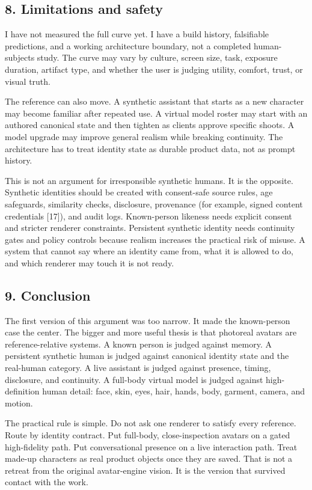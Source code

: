\documentclass[
]{article}
\begin{document}
\subsection{8. Limitations and safety}\label{8-limitations-and-safety}

I have not measured the full curve yet. I have a build history,
falsifiable predictions, and a working architecture boundary, not a
completed human-subjects study. The curve may vary by culture, screen
size, task, exposure duration, artifact type, and whether the user is
judging utility, comfort, trust, or visual truth.

The reference can also move. A synthetic assistant that starts as a new
character may become familiar after repeated use. A virtual model roster
may start with an authored canonical state and then tighten as clients
approve specific shoots. A model upgrade may improve general realism
while breaking continuity. The architecture has to treat identity state
as durable product data, not as prompt history.

This is not an argument for irresponsible synthetic humans. It is the
opposite. Synthetic identities should be created with consent-safe
source rules, age safeguards, similarity checks, disclosure, provenance
(for example, signed content credentials {[}17{]}), and audit logs.
Known-person likeness needs explicit consent and stricter renderer
constraints. Persistent synthetic identity needs continuity gates and
policy controls because realism increases the practical risk of misuse.
A system that cannot say where an identity came from, what it is allowed
to do, and which renderer may touch it is not ready.

\subsection{9. Conclusion}\label{9-conclusion}

The first version of this argument was too narrow. It made the
known-person case the center. The bigger and more useful thesis is that
photoreal avatars are reference-relative systems. A known person is
judged against memory. A persistent synthetic human is judged against
canonical identity state and the real-human category. A live assistant
is judged against presence, timing, disclosure, and continuity. A
full-body virtual model is judged against high-definition human detail:
face, skin, eyes, hair, hands, body, garment, camera, and motion.

The practical rule is simple. Do not ask one renderer to satisfy every
reference. Route by identity contract. Put full-body, close-inspection
avatars on a gated high-fidelity path. Put conversational presence on a
live interaction path. Treat made-up characters as real product objects
once they are saved. That is not a retreat from the original
avatar-engine vision. It is the version that survived contact with the
work.
\end{document}

